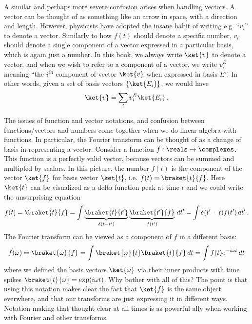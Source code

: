 A similar and perhaps more severe confusion arises when handling vectors.
A vector can be thought of as something like an arrow in space, with a direction and length.
However, physicists have adopted the insane habit of writing e.g. ``$v_i$'' to denote a vector.
Similarly to how $f(t)$ should denote a specific number, $v_i$ should denote a single component of a vector expressed in a particular basis, which is again just a number.
In this book, we always write $\ket{v}$ to denote a vector, and when we wish to refer to a component of a vector, we write $v^E_i$ meaning ``the $i^\text{th}$ component of vector $\ket{v}$ when expressed in basis $E$''.
In other words, given a set of basis vectors $\{\ket{E_i}\}$, we would have
\begin{equation*}
  \ket{v} = \sum_i v^E_i \ket{E_i} \, .
\end{equation*}

The issues of function and vector notations, and confusion between functions/vectors and numbers come together when we do linear algebra with functions.
In particular, the Fourier transform can be thought of as a change of basis in representing a vector.
Consider a function $f: \reals \rightarrow \complexes$.
This function is a perfectly valid vector, because vectors can be summed and multipled by scalars.
In this picture, the number $f(t)$ is the component of the vector $\ket{f}$ for basis vector $\ket{t}$, i.e. $f(t) = \braket{t}{f}$.
Here $\ket{t}$ can be visualized as a delta function peak at time $t$ and we could write the unsurprising equation
\begin{equation*}
  f(t)
  = \braket{t}{f}
  = \int \underbrace{\braket{t}{t'}}_{\delta(t - t')} \underbrace{\braket{t'}{f}}_{f(t')} \, dt'
  = \int \delta(t' - t) f(t') \, dt'
  \, .
\end{equation*}
The Fourier transform can be viewed as a component of $f$ in a different basis:
\begin{equation*}
  \tilde f(\omega) = \braket{\omega}{f} = \int \braket{\omega}{t} \braket{t}{f} \, dt = \int f(t) e^{-i \omega t} \, dt
\end{equation*}
where we defined the basis vectors $\ket{\omega}$ via their inner products with time spikes $\braket{t}{\omega} = \exp(i \omega t)$.
Why bother with all of this?
The point is that using this notation makes clear the fact that $\ket{f}$ is the same object everwhere, and that our transforms are just expressing it in different ways.
Notation making that thought clear at all times is as powerful ally when working with Fourier and other transforms.

